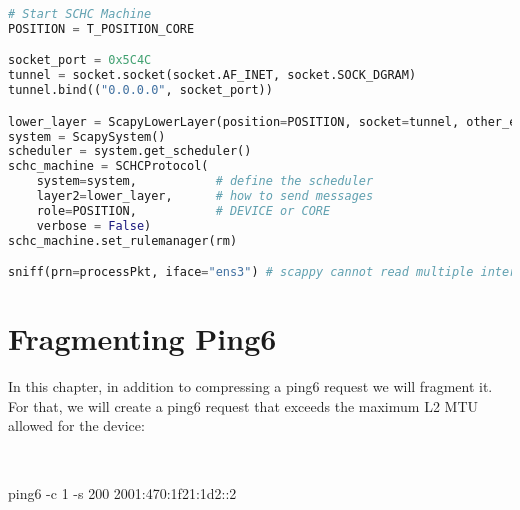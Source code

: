 \documentclass[onecolumn,12pt]{book}
\newcounter{c}
\begin{document}
\begin{lstlisting}[language=Python, caption={Program ping\_core2.py}, label=prog-ping-core2, basicstyle=\ttfamily\scriptsize]
# Start SCHC Machine
POSITION = T_POSITION_CORE

socket_port = 0x5C4C
tunnel = socket.socket(socket.AF_INET, socket.SOCK_DGRAM)
tunnel.bind(("0.0.0.0", socket_port))

lower_layer = ScapyLowerLayer(position=POSITION, socket=tunnel, other_end=None)
system = ScapySystem()
scheduler = system.get_scheduler()
schc_machine = SCHCProtocol(
    system=system,           # define the scheduler
    layer2=lower_layer,      # how to send messages
    role=POSITION,           # DEVICE or CORE
    verbose = False)         
schc_machine.set_rulemanager(rm)

sniff(prn=processPkt, iface="ens3") # scappy cannot read multiple interfaces
\end{lstlisting}

\chapter{Fragmenting Ping6}

In this chapter, in addition to compressing a ping6 request we will fragment it.
For that, we will create a ping6 request that exceeds the maximum L2 MTU allowed for the device:

~

\begin{termc}[backgroundcolor=\color{gray!10}, basicstyle=\ttfamily\small, escapechar=@]
ping6 -c 1 -s 200 2001:470:1f21:1d2::2
\end{termc}
\end{document}
